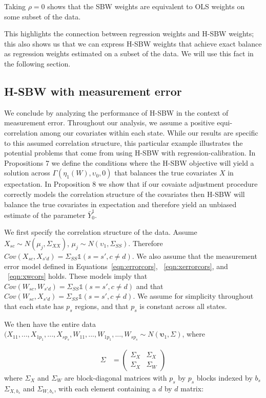 \begin{remark}
Taking $\rho = 0$ shows that the SBW weights are equivalent to OLS weights on some subset of the data.
\end{remark}

This highlights the connection between regression weights and H-SBW weights; this also shows us that we can express H-SBW weights that achieve exact balance as regression weights estimated on a  subset of the data. We will use this fact in the following section.

\subsection{H-SBW with measurement error}\label{app:AsecIII}

We conclude by analyzing the performance of H-SBW in the context of measurement error. Throughout our analysis, we assume a positive equi-correlation among our covariates within each state. While our results are specific to this assumed correlation structure, this particular example illustrates the potential problems that come from using H-SBW with regression-calibration. In Propositions 7 we define the conditions where the H-SBW objective will yield a solution across $\Gamma(\eta_1(W), \upsilon_0, 0)$ that balances the true covariates $X$ in expectation. In Proposition 8 we show that if our covaiate adjustment procedure correctly models the correlation structure of the covariates then H-SBW will balance the true covariates in expectation and therefore yield an unbiased estimate of the parameter $\bar{Y}_0^1$.

We first specify the correlation structure of the data. Assume $X_{sc} \sim N(\mu_j, \Sigma_{XX})$, $\mu_j \sim N(\upsilon_1, \Sigma_{SS})$. Therefore $Cov(X_{sc}, X_{s'd}) = \Sigma_{SS}\mathds{1}(s = s', c \ne d)$. We also assume that the measurement error model defined in Equations~\ref{eqn:errorcors}, ~\ref{eqn:xerrorcors}, and ~\ref{eqn:xwcors} holds. These models imply that $Cov(W_{sc}, W_{s'd}) = \Sigma_{SS}\mathds{1}(s = s', c \ne d)$ and that $Cov(W_{sc}, X_{s'd}) = \Sigma_{SS}\mathds{1}(s = s', c \ne d)$. We assume for simplicity throughout that each state has $p_s$ regions, and that $p_s$ is constant across all states.

We then have the entire data $(X_{11}, ..., X_{1p_1}, ..., X_{sp_s}, W_{11}, ..., W_{1p_1}, ..., W_{sp_s} \sim N(\mathbf{\upsilon}_1, \Sigma)$, where 

\begin{align*}
\Sigma &= \begin{pmatrix}
\Sigma_{X} & \Sigma_{X} \\
\Sigma_{X} & \Sigma_{W}
\end{pmatrix} 
\end{align*}
%
where $\Sigma_X$ and $\Sigma_W$ are block-diagonal matrices with $p_s$ by $p_s$ blocks indexed by $b_s$ $\Sigma_{X, b_s}$ and $\Sigma_{W, b_s}$, with each element containing a $d$ by $d$ matrix: 

